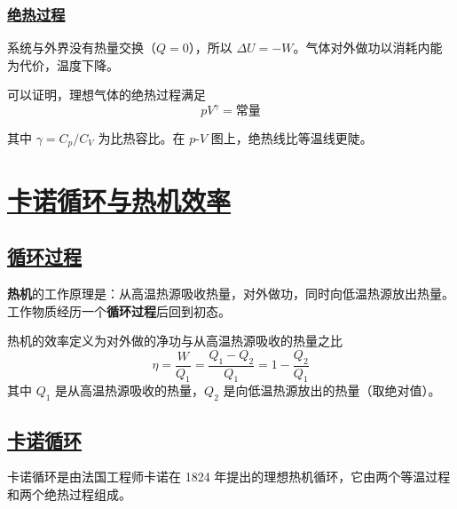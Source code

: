 \subsubsection{\protect\hyperlink{:}{绝热过程}}

系统与外界没有热量交换（$Q = 0$），所以 $\Delta U = -W$。气体对外做功以消耗内能为代价，温度下降。

可以证明，理想气体的绝热过程满足
\begin{equation}
    pV^\gamma = \text{常量}
\end{equation}

其中 $\gamma = C_p/C_V$ 为比热容比。在 $p$-$V$ 图上，绝热线比等温线更陡。


\section{\protect\hyperlink{:}{卡诺循环与热机效率}}

\subsection{\protect\hyperlink{:}{循环过程}}

\textbf{热机}的工作原理是：从高温热源吸收热量，对外做功，同时向低温热源放出热量。工作物质经历一个\textbf{循环过程}后回到初态。

\begin{definition}[热机效率]
    热机的效率定义为对外做的净功与从高温热源吸收的热量之比
    \begin{equation}
        \eta = \frac{W}{Q_1} = \frac{Q_1 - Q_2}{Q_1} = 1 - \frac{Q_2}{Q_1}
    \end{equation}
    其中 $Q_1$ 是从高温热源吸收的热量，$Q_2$ 是向低温热源放出的热量（取绝对值）。
\end{definition}

\subsection{\protect\hyperlink{:}{卡诺循环}}

卡诺循环是由法国工程师卡诺在 1824 年提出的理想热机循环，它由两个等温过程和两个绝热过程组成。

